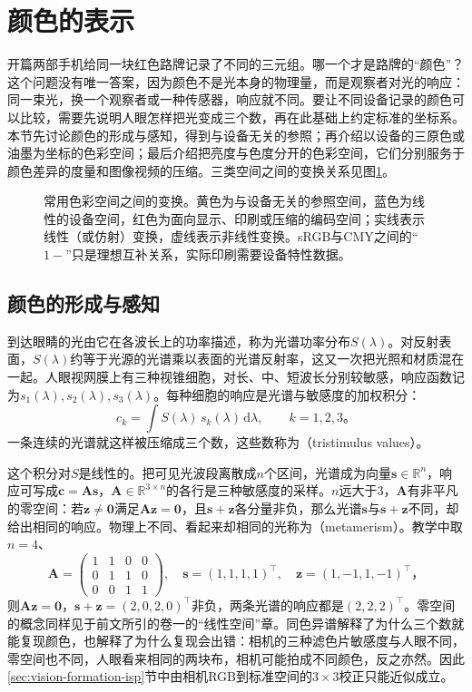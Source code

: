 \section{颜色的表示}
\label{sec:vision-formation-color}

开篇两部手机给同一块红色路牌记录了不同的三元组。哪一个才是路牌的“颜色”？这个问题没有唯一答案，因为颜色不是光本身的物理量，而是观察者对光的响应：同一束光，换一个观察者或一种传感器，响应就不同。要让不同设备记录的颜色可以比较，需要先说明人眼怎样把光变成三个数，再在此基础上约定标准的坐标系。本节先讨论颜色的形成与感知，得到与设备无关的参照；再介绍以设备的三原色或油墨为坐标的色彩空间；最后介绍把亮度与色度分开的色彩空间，它们分别服务于颜色差异的度量和图像视频的压缩。三类空间之间的变换关系见图\ref{fig:vision-formation-color-spaces}。

\begin{figure}[htbp]
  \centering
  
  \caption{常用色彩空间之间的变换。黄色为与设备无关的参照空间，蓝色为线性的设备空间，红色为面向显示、印刷或压缩的编码空间；实线表示线性（或仿射）变换，虚线表示非线性变换。sRGB与CMY之间的“$1-$”只是理想互补关系，实际印刷需要设备特性数据。}
  \label{fig:vision-formation-color-spaces}
\end{figure}

\subsection{颜色的形成与感知}
\label{sec:vision-formation-color-perception}

到达眼睛的光由它在各波长上的功率描述，称为光谱功率分布$S(\lambda)$。对反射表面，$S(\lambda)$约等于光源的光谱乘以表面的光谱反射率，这又一次把光照和材质混在一起。人眼视网膜上有三种视锥细胞，对长、中、短波长分别较敏感，响应函数记为$s_1(\lambda),s_2(\lambda),s_3(\lambda)$。每种细胞的响应是光谱与敏感度的加权积分：
\[
  c_k=\int S(\lambda)\,s_k(\lambda)\,\mathrm{d}\lambda,\qquad k=1,2,3\text{。}
\]
一条连续的光谱就这样被压缩成三个数，这些数称为（tristimulus values）。

这个积分对$S$是线性的。把可见光波段离散成$n$个区间，光谱成为向量$\bm s\in\mathbb{R}^n$，响应可写成$\bm c=\bm A\bm s$，$\bm A\in\mathbb{R}^{3\times n}$的各行是三种敏感度的采样。$n$远大于3，$\bm A$有非平凡的零空间：若$\bm z\ne\bm0$满足$\bm A\bm z=\bm0$，且$\bm s+\bm z$各分量非负，那么光谱$\bm s$与$\bm s+\bm z$不同，却给出相同的响应。物理上不同、看起来却相同的光称为（metamerism）。教学中取$n=4$、
\[
  \bm A=\begin{pmatrix}1&1&0&0\\0&1&1&0\\0&0&1&1\end{pmatrix},\quad
  \bm s=(1,1,1,1)^\top,\quad \bm z=(1,-1,1,-1)^\top\text{，}
\]
则$\bm A\bm z=\bm0$，$\bm s+\bm z=(2,0,2,0)^\top$非负，两条光谱的响应都是$(2,2,2)^\top$。零空间的概念同样见于前文所引的卷一的“线性空间”章。同色异谱解释了为什么三个数就能复现颜色，也解释了为什么复现会出错：相机的三种滤色片敏感度与人眼不同，零空间也不同，人眼看来相同的两块布，相机可能拍成不同颜色，反之亦然。因此\ref{sec:vision-formation-isp}节中由相机RGB到标准空间的$3\times3$校正只能近似成立。

